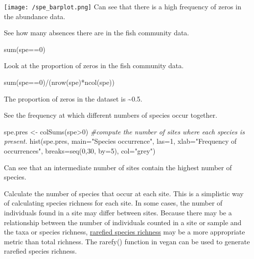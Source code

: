 \documentclass[
]{book}
\newenvironment{Shaded}{\begin{snugshade}}{\end{snugshade}}
\newcommand{\AttributeTok}[1]{\textcolor[rgb]{0.77,0.63,0.00}{#1}}
\newcommand{\CommentTok}[1]{\textcolor[rgb]{0.56,0.35,0.01}{\textit{#1}}}
\newcommand{\DecValTok}[1]{\textcolor[rgb]{0.00,0.00,0.81}{#1}}
\newcommand{\FunctionTok}[1]{\textcolor[rgb]{0.00,0.00,0.00}{#1}}
\newcommand{\NormalTok}[1]{#1}
\newcommand{\OtherTok}[1]{\textcolor[rgb]{0.56,0.35,0.01}{#1}}
\newcommand{\SpecialCharTok}[1]{\textcolor[rgb]{0.00,0.00,0.00}{#1}}
\newcommand{\StringTok}[1]{\textcolor[rgb]{0.31,0.60,0.02}{#1}}
\begin{document}
\texttt{[image: /spe\_barplot.png]} Can see that there is a high
frequency of zeros in the abundance data.

See how many absences there are in the fish community data.

\begin{Shaded}
\begin{Highlighting}[]
\FunctionTok{sum}\NormalTok{(spe}\SpecialCharTok{==}\DecValTok{0}\NormalTok{) }
\end{Highlighting}
\end{Shaded}

Look at the proportion of zeros in the fish community data.

\begin{Shaded}
\begin{Highlighting}[]
\FunctionTok{sum}\NormalTok{(spe}\SpecialCharTok{==}\DecValTok{0}\NormalTok{)}\SpecialCharTok{/}\NormalTok{(}\FunctionTok{nrow}\NormalTok{(spe)}\SpecialCharTok{*}\FunctionTok{ncol}\NormalTok{(spe))}
\end{Highlighting}
\end{Shaded}

The proportion of zeros in the dataset is \textasciitilde0.5.

See the frequency at which different numbers of species occur together.

\begin{Shaded}
\begin{Highlighting}[]
\NormalTok{spe.pres }\OtherTok{\textless{}{-}} \FunctionTok{colSums}\NormalTok{(spe}\SpecialCharTok{\textgreater{}}\DecValTok{0}\NormalTok{) }\CommentTok{\#compute the number of sites where each species is present. }
\FunctionTok{hist}\NormalTok{(spe.pres, }\AttributeTok{main=}\StringTok{"Species occurrence"}\NormalTok{, }\AttributeTok{las=}\DecValTok{1}\NormalTok{, }\AttributeTok{xlab=}\StringTok{"Frequency of occurrences"}\NormalTok{, }\AttributeTok{breaks=}\FunctionTok{seq}\NormalTok{(}\DecValTok{0}\NormalTok{,}\DecValTok{30}\NormalTok{, }\AttributeTok{by=}\DecValTok{5}\NormalTok{), }\AttributeTok{col=}\StringTok{"grey"}\NormalTok{)}
\end{Highlighting}
\end{Shaded}

Can see that an intermediate number of sites contain the highest number
of species.

Calculate the number of species that occur at each site. This is a
simplistic way of calculating species richness for each site. In some
cases, the number of individuals found in a site may differ between
sites. Because there may be a relationship between the number of
individuals counted in a site or sample and the taxa or species
richness, \href{http://cc.oulu.fi/~jarioksa/softhelp/vegan/html/diversity.html}{rarefied species
richness}
may be a more appropriate metric than total richness. The rarefy()
function in vegan can be used to generate rarefied species richness.
\end{document}
